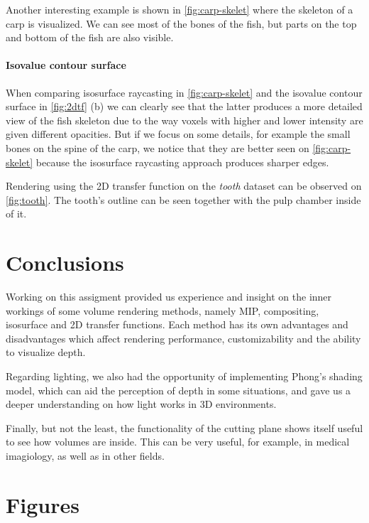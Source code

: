 \documentclass[a4paper]{article}
\begin{document}
Another interesting example is shown in \autoref{fig:carp-skelet} where the skeleton of a carp is visualized. We can see most of the bones of the fish, but parts on the top and bottom of the fish are also visible.

\paragraph{Isovalue contour surface}

When comparing isosurface raycasting in \autoref{fig:carp-skelet} and the isovalue contour surface in \autoref{fig:2dtf} (b) we can clearly see that the latter produces a more detailed view of the fish skeleton due to the way voxels with higher and lower intensity are given different opacities. But if we focus on some details, for example the small bones on the spine of the carp, we notice that they are better seen on \autoref{fig:carp-skelet} because the isosurface raycasting approach produces sharper edges.

Rendering using the 2D transfer function on the \textit{tooth} dataset can be observed on \autoref{fig:tooth}. The tooth's outline can be seen together with the pulp chamber inside of it.

\section{Conclusions}

Working on this assigment provided us experience and insight on the inner workings of some volume rendering methods, namely MIP, compositing, isosurface and 2D transfer functions. Each method has its own advantages and disadvantages which affect rendering performance, customizability and the ability to visualize depth.

Regarding lighting, we also had the opportunity of implementing Phong's shading model, which can aid the perception of depth in some situations, and gave us a deeper understanding on how light works in 3D environments.

Finally, but not the least, the functionality of the cutting plane shows itself useful to see how volumes are inside. This can be very useful, for example, in medical imagiology, as well as in other fields.




\pagebreak
\appendix
\section{Figures}
\end{document}
